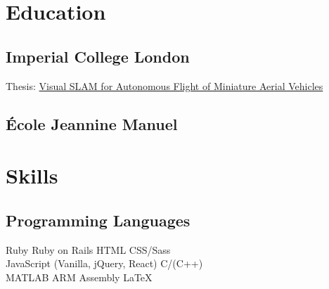 \documentclass[a4paper]{alex-resume}
\begin{document}
\begin{minipage}[t]{0.38\textwidth}


\section{Education}

\subsection{Imperial College London}
{}
Thesis: \href{https://www.academia.edu/28884452/Implementation_of_Monocular_Visual_SLAM_Algorithms_for_Safe_Autonomous_Navigation_of_Miniature_Aerial_Vehicles_MAVs_in_Unknown_Environments}{Visual SLAM for Autonomous Flight of Miniature Aerial Vehicles}
\sectionsep


\subsection{École Jeannine Manuel}
{}

\chaptersep


\section{Skills}

\subsection{Programming Languages}
\location{}
Ruby \textbullet{} Ruby on Rails \textbullet{} HTML \textbullet{} CSS/Sass \\ JavaScript (Vanilla, jQuery, React) \textbullet{} C/(C++) \\
MATLAB \textbullet{} ARM Assembly \textbullet{} \LaTeX \\


\end{minipage}
\end{document}
